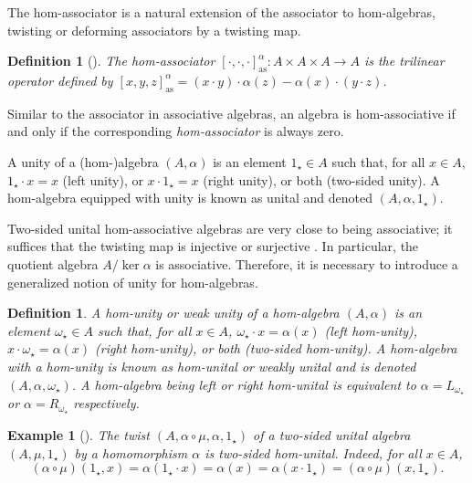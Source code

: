 \documentclass[12pt]{article}
\newtheorem{definition}[theorem]{Definition}
\newtheorem{example}[theorem]{Example}
\begin{document}
		The hom-associator is a natural extension of the associator to hom-algebras, twisting or deforming associators by a twisting map.

		\begin{definition}[\!\!{\cite[Definition 2.5]{ms:homstructure}}]
			The hom-associator $[\cdot,\cdot,\cdot]_{\mathrm{as}}^\alpha\colon A\times A\times A\rightarrow A$ is the trilinear operator defined by $[x,y,z]_{\mathrm{as}}^\alpha=(x\cdot y)\cdot \alpha(z)-\alpha(x)\cdot (y\cdot z)$.
		\end{definition}
		
		Similar to the associator in associative algebras, an algebra is hom-associative if and only if the corresponding \textit{hom-associator} is always zero.
		
		A unity of a (hom-)algebra $(A,\alpha)$ is an element $1_\star\in A$ such that, for all $x\in A$, $1_\star\cdot x=x$ (left unity), or $x\cdot 1_\star=x$ (right unity), or both (two-sided unity). A hom-algebra equipped with unity is known as unital and denoted $(A,\alpha,1_\star)$.
		
		Two-sided unital hom-associative algebras are very close to being associative; it suffices that the twisting map is injective or surjective \cite{FreGohrSil:UnitalSurj}. In particular, the quotient algebra $A/\ker\alpha$ is associative. Therefore, it is necessary to introduce a generalized notion of unity for hom-algebras.
		
		\begin{definition}
			A hom-unity or weak unity of a hom-algebra $(A,\alpha)$ is an element $\omega_\star\in A$ such that, for all $x\in A$, $\omega_\star\cdot x=\alpha(x)$ (left hom-unity), $x\cdot \omega_\star=\alpha(x)$ (right hom-unity), or both (two-sided hom-unity). A hom-algebra with a hom-unity is known as hom-unital or weakly unital and is denoted $(A,\alpha,\omega_\star)$.
			A hom-algebra being left or right hom-unital is equivalent to $\alpha=L_{\omega_\star}$ or  $\alpha=R_{\omega_\star}$ respectively.
		\end{definition}
		\begin{example}[\!\!\cite{FreGohr:UnitCond}]
			The twist $(A,\alpha\circ\mu,\alpha,1_\star)$ of a two-sided unital algebra $(A,\mu,1_\star)$ by a homomorphism $\alpha$ is two-sided hom-unital. Indeed, for all $x\in A$,
			\begin{equation*}
				(\alpha\circ\mu)(1_\star, x)=\alpha(1_\star\cdot x)=\alpha(x)=\alpha(x\cdot 1_\star)=(\alpha\circ\mu)(x,1_\star).
			\end{equation*}
		\end{example}
		
\end{document}
